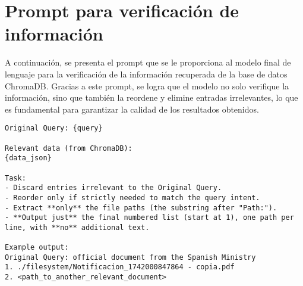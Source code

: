
\chapter{Prompt para verificación de información}
\label{anx:prompt_verify}

A continuación, se presenta el prompt que se le proporciona al modelo final de lenguaje para la verificación de la información recuperada de la base de datos ChromaDB. Gracias a este prompt, se logra que el modelo no solo verifique la información, sino que también la reordene y elimine entradas irrelevantes, lo que es fundamental para garantizar la calidad de los resultados obtenidos.

\begin{lstlisting}[caption={Prompt para la descripción de imágenes.}, label={lst:prompt_img_desc}]
Original Query: {query}

Relevant data (from ChromaDB):
{data_json}

Task:
- Discard entries irrelevant to the Original Query.
- Reorder only if strictly needed to match the query intent.
- Extract **only** the file paths (the substring after "Path:").
- **Output just** the final numbered list (start at 1), one path per line, with **no** additional text.

Example output:
Original Query: official document from the Spanish Ministry
1. ./filesystem/Notificacion_1742000847864 - copia.pdf
2. <path_to_another_relevant_document>
\end{lstlisting}